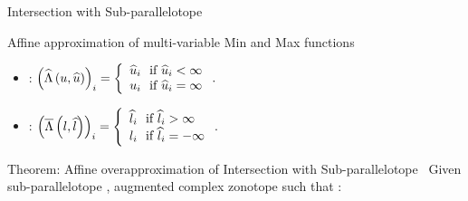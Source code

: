 \begin{frame}{Intersection with Sub-parallelotope}
\begin{exampleblock}{Affine approximation of multi-variable Min and Max functions}
{\small
\begin{itemize}
\item {}:
$\left(\widehat{\Lambda}\left(u,\widehat{u}\right)\right)_i = \left\{
\begin{array}{l}
\widehat{u}_i~~\text{if}~\widehat{u}_i<\infty\\
u_i~~\text{if}~\widehat{u}_i=\infty
\end{array}
\right..$\\
\item {}:
$\left(\overline{\Lambda}\left(l,\widehat{l}\right)\right)_i = \left\{
\begin{array}{l}
\widehat{l}_i~~\text{if}~\widehat{l}_i>\infty\\
l_i~~\text{if}~\widehat{l}_i=-\infty
\end{array}
\right..$
\end{itemize}
}
\end{exampleblock}
\begin{block}{Theorem: Affine overapproximation of Intersection with Sub-parallelotope}~\label{thm:acz-int}
{\small Given sub-parallelotope ,
augmented complex zonotope 
such that :}
\vspace{-1em}
\end{block}
%
\end{frame}

